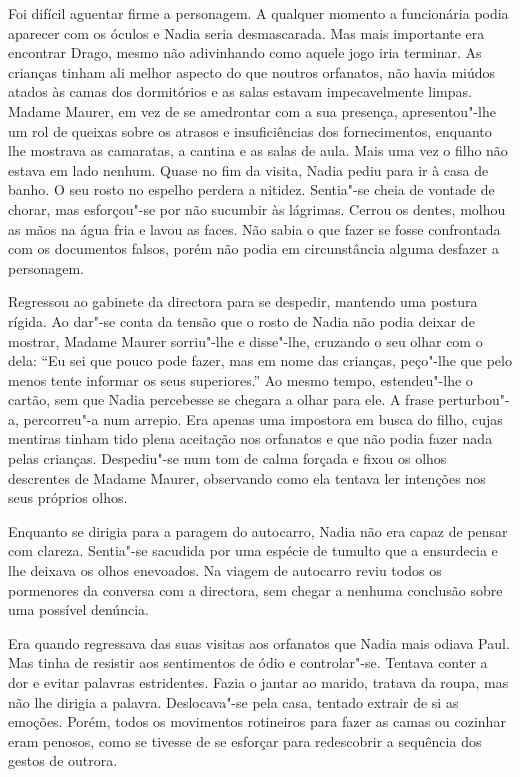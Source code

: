 Foi difícil aguentar firme a personagem. A qualquer momento a
funcionária podia aparecer com os óculos e Nadia seria desmascarada. Mas
mais importante era encontrar Drago, mesmo não adivinhando como aquele
jogo iria terminar. As crianças tinham ali melhor aspecto do que noutros
orfanatos, não havia miúdos atados às camas dos dormitórios e as salas
estavam impecavelmente limpas. Madame Maurer, em vez de se amedrontar
com a sua presença, apresentou"-lhe um rol de queixas sobre os atrasos e
insuficiências dos fornecimentos, enquanto lhe mostrava as camaratas, a
cantina e as salas de aula. Mais uma vez o filho não estava em lado
nenhum. Quase no fim da visita, Nadia pediu para ir à casa de banho. O
seu rosto no espelho perdera a nitidez. Sentia"-se cheia de vontade de
chorar, mas esforçou"-se por não sucumbir às lágrimas. Cerrou os dentes,
molhou as mãos na água fria e lavou as faces. Não sabia o que fazer se
fosse confrontada com os documentos falsos, porém não podia em
circunstância alguma desfazer a personagem.

Regressou ao gabinete da directora para se despedir,
mantendo uma postura rígida. Ao dar"-se conta da tensão que o rosto de
Nadia não podia deixar de mostrar, Madame Maurer sorriu"-lhe e disse"-lhe,
cruzando o seu olhar com o dela: ``Eu sei que pouco pode fazer, mas em
nome das crianças, peço"-lhe que pelo menos tente informar os seus
superiores.'' Ao mesmo tempo, estendeu"-lhe o cartão, sem que Nadia
percebesse se chegara a olhar para ele. A frase perturbou"-a, percorreu"-a
num arrepio. Era apenas uma impostora em busca do filho, cujas mentiras
tinham tido plena aceitação nos orfanatos e que não podia
fazer nada pelas crianças. Despediu"-se num tom de calma forçada e fixou
os olhos descrentes de Madame Maurer, observando como ela tentava ler
intenções nos seus próprios olhos.

Enquanto se dirigia para a paragem do autocarro, Nadia não era capaz de
pensar com clareza. Sentia"-se sacudida por uma espécie de tumulto que a
ensurdecia e lhe deixava os olhos enevoados. Na viagem de autocarro
reviu todos os pormenores da conversa com a directora, sem chegar a
nenhuma conclusão sobre uma possível denúncia.

\bigskip

Era quando regressava das suas visitas aos orfanatos que Nadia mais
odiava Paul. Mas tinha de resistir aos sentimentos de ódio e
controlar"-se. Tentava conter a dor e evitar palavras estridentes. Fazia
o jantar ao marido, tratava da roupa, mas não lhe dirigia a palavra.
Deslocava"-se pela casa, tentado extrair de si as emoções. Porém, todos
os movimentos rotineiros para fazer as camas ou cozinhar eram penosos,
como se tivesse de se esforçar para redescobrir a sequência dos gestos
de outrora.

